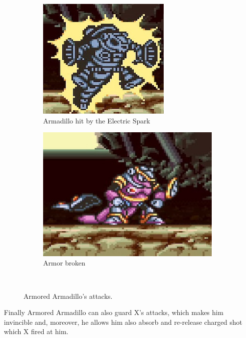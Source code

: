 \begin{figure}[htp]
	\ContinuedFloat
	\centering
	\begin{subfigure}[t]{0.4\textwidth}
		\centering
		\includegraphics[width=\linewidth]{figures/X1/Armored_armadillo/Armadillo_shock_1.jpg}
		\caption{Armadillo hit by the Electric Spark}
	\end{subfigure}
	\begin{subfigure}[t]{0.4\textwidth}
		\centering
		\includegraphics[width=\linewidth]{figures/X1/Armored_armadillo/Armadillo_shock_2.jpg}
		\caption{Armor broken}
	\end{subfigure}\\
	\caption{Armored Armadillo's attacks.}
\end{figure}
Finally Armored Armadillo can also guard X's attacks, which makes him invincible and, moreover, he allows him also absorb and re-release charged shot which X fired at him.  

